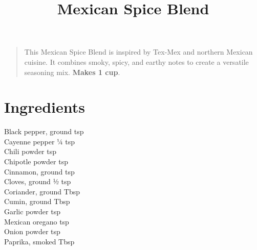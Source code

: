 \documentclass[11pt,letterpaper]{article}
\title{Mexican Spice Blend}
\author{}
\date{}
\begin{document}
\maketitle
\thispagestyle{empty}

\begin{quote}
\small
\begin{em}
This Mexican Spice Blend is inspired by Tex-Mex and northern Mexican cuisine. It combines smoky, spicy, and earthy notes to create a versatile seasoning mix. \textbf{Makes 1 cup}.
\end{em}
\end{quote}

\section*{Ingredients}

Black pepper, ground  tsp \\
Cayenne pepper \dotfill ¼ tsp \\
Chili powder  tsp \\
Chipotle powder  tsp \\
Cinnamon, ground  tsp \\
Cloves, ground \dotfill ½ tsp \\
Coriander, ground  Tbsp \\
Cumin, ground  Tbsp \\
Garlic powder  tsp \\
Mexican oregano  tsp \\
Onion powder  tsp \\
Paprika, smoked  Tbsp
    
\end{document}
